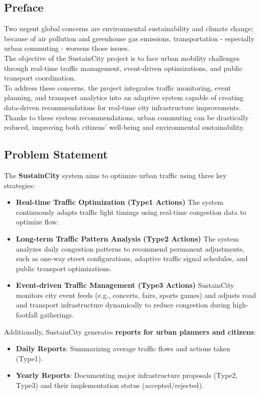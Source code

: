 \documentclass[a4paper,12pt]{article}
\begin{document}
\subsection*{Preface}
Two urgent global concerns are environmental sustainability and climate change; because of air pollution and greenhouse gas emissions, transportation - especially urban commuting - worsens those issues. 
\\ The objective of the SustainCity project is to face urban mobility challenges through real-time traffic management, event-driven optimizations, and public transport coordination. 
\\ To address these concerns, the project integrates traffic monitoring, event planning, and transport analytics into an adaptive system capable of creating data-driven recommendations for real-time city infrastructure improvements. 
\\ Thanks to these system recommendations, urban commuting can be drastically reduced, improving both citizens’ well-being and environmental sustainability.

\subsection*{Problem Statement}
The \textbf{SustainCity} system aims to optimize urban traffic using three key strategies:
\begin{itemize}
    \item \textbf{Real-time Traffic Optimization (Type1 Actions)} 
    The system continuously adapts traffic light timings using real-time congestion data to optimize flow.  
    \item \textbf{Long-term Traffic Pattern Analysis (Type2 Actions)}  
    The system analyzes daily congestion patterns to recommend permanent adjustments, such as one-way street configurations, adaptive traffic signal schedules, and public transport optimizations.
    \item \textbf{Event-driven Traffic Management (Type3 Actions)}
    SustainCity monitors city event feeds (e.g., concerts, fairs, sports games) and adjusts road and transport infrastructure dynamically to reduce congestion during high-footfall gatherings.
\end{itemize}

\noindent Additionally, SustainCity generates \textbf{reports for urban planners and citizens}:
\begin{itemize}
    \item \textbf{Daily Reports}: Summarizing average traffic flows and actions taken (Type1).
    \item \textbf{Yearly Reports}: Documenting major infrastructure proposals (Type2, Type3) and their implementation status (accepted/rejected).
\end{itemize}
\end{document}
